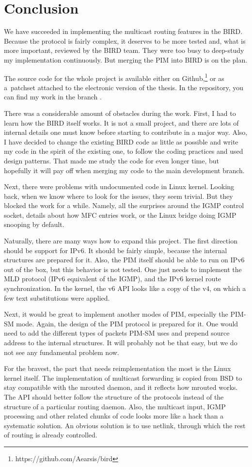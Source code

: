 \chapter*{Conclusion}

We have succeeded in implementing the multicast routing features in the BIRD.
Because the protocol is fairly complex, it deserves to be more tested and, what
is more important, reviewed by the BIRD team. They were too busy to deep-study
my implementation continuously. But merging the PIM into BIRD is on the plan.

The source code for the whole project is available either on Github,\footnote{https://github.com/Aearsis/bird}
or as a~patchset attached to the electronic version of the thesis.
In the repository, you can find my work in the branch .

There was a considerable amount of obstacles during the work. First, I had to
learn how the BIRD itself works. It is not a small project, and there are lots
of internal details one must know before starting to contribute in a major way.
Also, I have decided to change the existing BIRD code as little as possible and
write my code in the spirit of the existing one, to follow the coding practices
and used design patterns. That made me study the code for even longer time, but
hopefully it will pay off when merging my code to the main development branch.

Next, there were problems with undocumented code in Linux kernel. Looking back,
when we know where to look for the issues, they seem trivial. But they blocked
the work for a while. Namely, all the surprises around the IGMP control socket,
details about how MFC entries work, or the Linux bridge doing IGMP snooping by
default.

Naturally, there are many ways how to expand this project. The first direction
should be support for IPv6. It should be fairly simple, because the internal
structures are prepared for it. Also, the PIM itself should be able to run on
IPv6 out of the box, but this behavior is not tested. One just needs to
implement the MLD protocol (IPv6 equivalent of the IGMP), and the IPv6 kernel
route synchronization. In the kernel, the v6 API looks like a copy of the v4,
on which a few text substitutions were applied.

Next, it would be great to implement another modes of PIM, especially the PIM-SM mode.
Again, the design of the PIM protocol is prepared for it. One would need to
add the different types of packets PIM-SM uses and prepend source address to
the internal structures. It will probably not be that easy, but we do not see
any fundamental problem now.

For the bravest, the part that needs reimplementation the most is the Linux
kernel itself. The implementation of multicast forwarding is copied from BSD to
stay compatible with the mrouted daemon, and it reflects how mrouted works.
The API should better follow the structure of the protocols instead of the
structure of a particular routing daemon. Also, the multicast input, IGMP
processing and other related chunks of code looks more like a hack than
a systematic solution. An obvious solution is to use netlink, through which the
rest of routing is already controlled.
